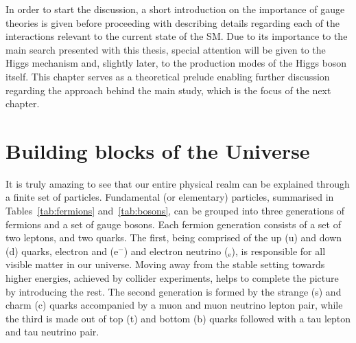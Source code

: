 \hspace{10pt} In order to start the discussion, a short introduction on the importance of gauge theories is given before proceeding with describing details regarding each of the interactions relevant to the current state of the SM. Due to its importance to the main search presented with this thesis, special attention will be given to the Higgs mechanism and, slightly later, to the production modes of the Higgs boson itself. This chapter serves as a theoretical prelude enabling further discussion regarding the approach behind the main study, which is the focus of the next chapter.
\newpage
\section{Building blocks of the Universe}
\hspace{10pt} It is truly amazing to see that our entire physical realm can be explained through a finite set of particles. Fundamental (or elementary) particles, summarised in Tables~\ref{tab:fermions} and~\ref{tab:bosons}, can be grouped into three generations of fermions and a set of gauge bosons. Each fermion generation consists of a set of two leptons, and two quarks. The first, being comprised of the up (u) and down (d) quarks, electron and (e$^{-}$) and electron neutrino (\textnu$_\text{e}$), is responsible for all visible matter in our universe. Moving away from the stable setting towards higher energies, achieved by collider experiments, helps to complete the picture by introducing the rest. The second generation is formed by the strange (s) and charm (c) quarks accompanied by a muon and muon neutrino lepton pair, while the third is made out of top (t) and bottom (b) quarks followed with a tau lepton and tau neutrino pair.

